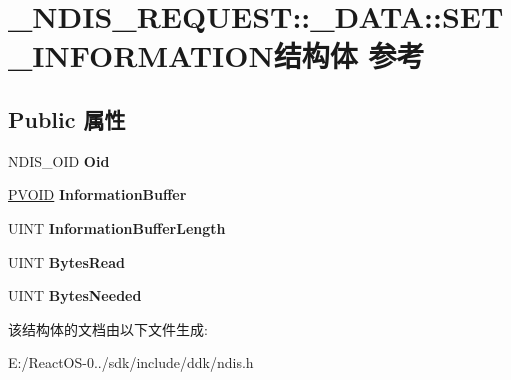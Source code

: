 \hypertarget{struct___n_d_i_s___r_e_q_u_e_s_t_1_1___d_a_t_a_1_1_s_e_t___i_n_f_o_r_m_a_t_i_o_n}{}\section{\+\_\+\+N\+D\+I\+S\+\_\+\+R\+E\+Q\+U\+E\+ST\+:\+:\+\_\+\+D\+A\+TA\+:\+:S\+E\+T\+\_\+\+I\+N\+F\+O\+R\+M\+A\+T\+I\+O\+N结构体 参考}
\label{struct___n_d_i_s___r_e_q_u_e_s_t_1_1___d_a_t_a_1_1_s_e_t___i_n_f_o_r_m_a_t_i_o_n}
\subsection*{Public 属性}
\begin{DoxyCompactItemize}
\item 
\mbox{\label{struct___n_d_i_s___r_e_q_u_e_s_t_1_1___d_a_t_a_1_1_s_e_t___i_n_f_o_r_m_a_t_i_o_n_a56a9f5075af1ae30b96595ef32c75363}} 
N\+D\+I\+S\+\_\+\+O\+ID {\bfseries Oid}
\item 
\mbox{\label{struct___n_d_i_s___r_e_q_u_e_s_t_1_1___d_a_t_a_1_1_s_e_t___i_n_f_o_r_m_a_t_i_o_n_aa3a11023c6861ea5e088c52115f8a39a}} 
\hyperlink{interfacevoid}{P\+V\+O\+ID} {\bfseries Information\+Buffer}
\item 
\mbox{\label{struct___n_d_i_s___r_e_q_u_e_s_t_1_1___d_a_t_a_1_1_s_e_t___i_n_f_o_r_m_a_t_i_o_n_ae31e2d2a96de87159c17c49fcd635a2d}} 
U\+I\+NT {\bfseries Information\+Buffer\+Length}
\item 
\mbox{\label{struct___n_d_i_s___r_e_q_u_e_s_t_1_1___d_a_t_a_1_1_s_e_t___i_n_f_o_r_m_a_t_i_o_n_a4a70eea2699cfec53c372308e2c1263a}} 
U\+I\+NT {\bfseries Bytes\+Read}
\item 
\mbox{\label{struct___n_d_i_s___r_e_q_u_e_s_t_1_1___d_a_t_a_1_1_s_e_t___i_n_f_o_r_m_a_t_i_o_n_a946cbcaa627cf813d18a62cf87ac7e29}} 
U\+I\+NT {\bfseries Bytes\+Needed}
\end{DoxyCompactItemize}


该结构体的文档由以下文件生成\+:\begin{DoxyCompactItemize}
\item 
E\+:/\+React\+O\+S-\/0../sdk/include/ddk/ndis.\+h\end{DoxyCompactItemize}
